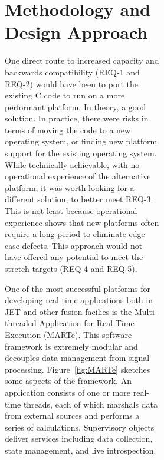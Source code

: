 \documentclass[preprint]{elsarticle}
\begin{document}
\begin{figure}[!p]
\begin{figure}[p]
\begin{figure}[p]
\section{Methodology and Design Approach}

One direct route to 
increased capacity and backwards compatibility (REQ-1 and REQ-2)  would have been to port the existing
C code to run on a more performant platform. In theory, a good solution.  In 
practice, there were risks in terms of moving the code to a new operating system,
or finding new platform support for the existing operating system. While technically
achievable, with no operational experience of the alternative platform, it was
worth looking for a different solution, to better meet REQ-3.  This is not least because
operational experience shows that new platforms often require a long period to eliminate
edge case defects. This approach would not have offered any potential to meet the 
stretch targets (REQ-4 and REQ-5).

One of the most successful platforms for developing real-time applications
both in JET and other fusion facilies is the Multi-threaded Application for
Real-Time Execution (MARTe\cite{netoSurveyRecentMARTe2011}).
This software framework is extremely modular and decouples data management
from signal processing.  Figure~\ref{fig:MARTe} sketches some aspects of the framework.
An application consists of one or more real-time threads, each of which marshals
data from external sources and performs a series of calculations.  Supervisory objects
deliver services including data collection, state management, and live introspection.


\end{figure}
\end{figure}
\end{figure}
\end{document}
